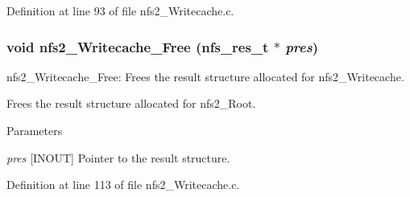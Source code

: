 Definition at line 93 of file nfs2\_\-Writecache.c.
\subsubsection[{nfs2\_\-Writecache\_\-Free}]{\setlength{\rightskip}{0pt plus 5cm}void nfs2\_\-Writecache\_\-Free (nfs\_\-res\_\-t $\ast$ {\em pres})}\label{nfs2__Writecache_8c_ae8612a8951c969d29ed4a48b5b5dc13e}
nfs2\_\-Writecache\_\-Free: Frees the result structure allocated for nfs2\_\-Writecache.

Frees the result structure allocated for nfs2\_\-Root.


\begin{DoxyParams}{Parameters}
\item[{\em pres}][INOUT] Pointer to the result structure. \end{DoxyParams}


Definition at line 113 of file nfs2\_\-Writecache.c.